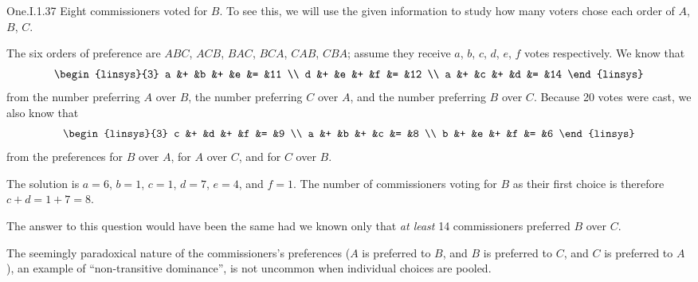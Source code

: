 \begin{ans}{One.I.1.37}
       \answerasgiven
       Eight commissioners voted for $B$.
       To see this, we will use the given information to study how many voters
       chose each order of $A$, $B$, $C$.

       The six orders of preference are $ABC$, $ACB$, $BAC$, $BCA$, $CAB$,
       $CBA$; assume they receive $a$, $b$, $c$, $d$, $e$, $f$ votes
       respectively.
       We know that
       \begin{equation*}
         \begin{linsys}{3}
           a  &+  &b  &+  &e  &=  &11  \\
           d  &+  &e  &+  &f  &=  &12  \\
           a  &+  &c  &+  &d  &=  &14
         \end{linsys}
       \end{equation*}
       from the number preferring $A$ over $B$, the number preferring
       $C$ over $A$, and the number preferring $B$ over $C$.
       Because 20 votes were cast, we also know that
       \begin{equation*}
         \begin{linsys}{3}
           c  &+  &d  &+  &f  &=  &9  \\
           a  &+  &b  &+  &c  &=  &8  \\
           b  &+  &e  &+  &f  &=  &6
         \end{linsys}
       \end{equation*}
       from the preferences for $B$ over $A$, for $A$ over $C$, and for
       $C$ over $B$.

       The solution is $a=6$, $b=1$, $c=1$, $d=7$, $e=4$, and $f=1$.
       The number of commissioners voting for $B$ as their first choice
       is therefore $c+d=1+7=8$.

       \par{}
       The answer to this question would have been the same had we known only
       that {\em at least\/} 14 commissioners preferred $B$ over $C$.

       The seemingly paradoxical nature of the commissioners's preferences
       ($A$ is preferred to $B$, and $B$ is preferred to $C$, and $C$ is
       preferred to $A$), an example of ``non-transitive dominance'', is not
       uncommon when individual choices are pooled.
     
\end{ans}
